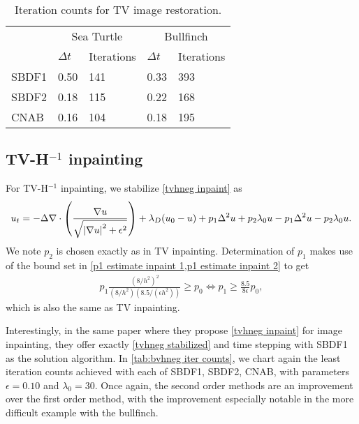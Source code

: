 
\begin{table}[htb!]
\caption[Iteration counts for TV image restoration.]{Iteration counts for TV image restoration.}
        \centering\begin{tabular}{lll ll} \toprule[1.25pt]
& \multicolumn{2}{c}{Sea Turtle} & \multicolumn{2}{c}{Bullfinch}
\\
& $\Delta t$ & Iterations & $\Delta t$ & Iterations
\\ \midrule
SBDF1 & 0.50 & 141 & 0.33 & 393 
\\
SBDF2& 0.18 & 115 & 0.22 & 168
\\             
CNAB &  0.16 & 104 & 0.18 & 195
\\ \bottomrule[1.25pt]
\end{tabular}
\label{tab:bv iter counts}
\end{table}

\subsection{TV-H\texorpdfstring{$^{-1}$}{-1} inpainting}
For TV-H$^{-1}$ inpainting, we stabilize \cref{tvhneg inpaint} as 
\begin{align}
        u_t = -\Delta \nabla \cdot \left(\frac{\nabla u}{\sqrt{\left|\nabla u\right|^2 + \epsilon^2}} \right) + \lambda_D(u_0 - u)  + p_1\Delta^2 u + p_2\lambda_0 u - p_1\Delta^2 u - p_2\lambda_0 u.
\label{tvhneg stabilized}
\end{align}
We note $p_2$ is chosen exactly as in TV inpainting. Determination of $p_1$ makes use of the bound set in \cref{p1 estimate inpaint 1,p1 estimate inpaint 2} to get 
\begin{align}
        p_1\frac{(8/h^2)^2}{(8/h^2)(8.5/(\epsilon h^2))} \geq p_0 
\iff p_1 \geq \frac{8.5}{8\epsilon}p_0,
\end{align}
which is also the same as TV inpainting.

Interestingly, in the same paper where they propose \cref{tvhneg inpaint} for image inpainting, they offer exactly \cref{tvhneg stabilized} and time stepping with SBDF1 as the solution algorithm. In \cref{tab:bvhneg iter counts}, we chart again the least iteration counts achieved with each of SBDF1, SBDF2, CNAB, with parameters $\epsilon=0.10$ and $\lambda_0=30$. Once again, the second order methods are an improvement over the first order method, with the improvement especially notable in the more difficult example with the bullfinch. 

